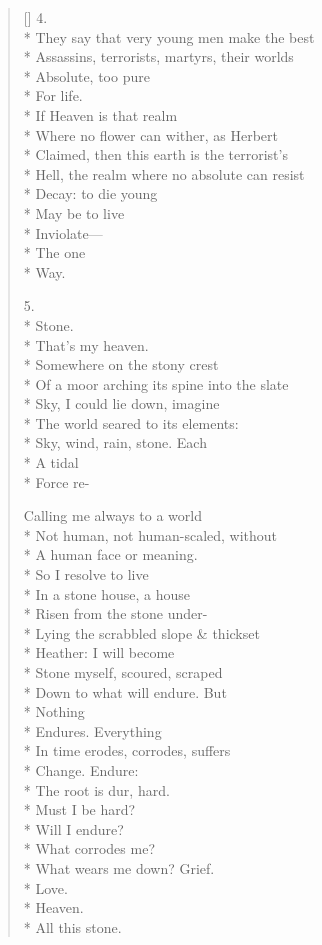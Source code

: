 \begin{verse}[\versewidth]
4.\\*
They say that very young men make the best\\*
Assassins, terrorists, martyrs, their worlds\\*
Absolute, too pure\\*
For life.\\*
If Heaven is that realm\\*
Where no flower can wither, as Herbert\\*
Claimed, then this earth is the terrorist's\\*
Hell, the realm where no absolute can resist\\*
Decay: to die young\\*
May be to live\\*
Inviolate---\\*
The one\\*
Way.

5.\\*
Stone.\\*
That's my heaven.\\*
Somewhere on the stony crest\\*
Of a moor arching its spine into the slate\\*
Sky, I could lie down, imagine\\*
The world seared to its elements:\\*
Sky, wind, rain, stone. Each\\*
A tidal\\*
Force re-

Calling me always to a world\\*
Not  human, not human-scaled, without\\*
A human face or meaning.\\*
So I resolve to live\\*
In a stone house, a house\\*
Risen from the stone under-\\*
Lying the scrabbled slope \& thickset\\*
Heather: I will become\\*
Stone myself, scoured, scraped\\*
Down to what will endure. But\\*
Nothing\\*
Endures. Everything\\*
In time erodes, corrodes, suffers\\*
Change. Endure:\\*
The root is dur, hard.\\*
Must I be hard?\\*
Will I endure?\\*
What corrodes me?\\*
What wears me down?  Grief.\\*
Love. \\*
Heaven.\\*
All this stone.


\end{verse}
